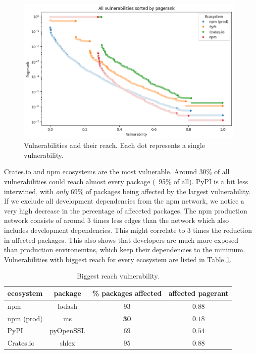 \documentclass[9pt,twocolumn,twoside]{pnas-report}
\begin{document}
\begin{figure}[t]\centering%
	\includegraphics[width=\linewidth]{vulns_pagerank.png}
	\caption{Vulnerabilities and their reach. Each dot represents a single vulnerability. }
	\label{fig:reach}
\end{figure}

Crates.io and npm ecosystems are the most vulnerable.
Around 30\% of all vulnerabilities could reach almost every package (~95\% of all).
PyPI is a bit less interwined, with \textit{only} 69\% of packages being affected by the largest vulnerability.
If we exclude all development dependencies from the npm network, we notice a very high decrease in the percentage of affeceted packages.
The npm production network consists of around 3 times less edges than the network which also includes development dependencies.
This might correlate to 3 times the reduction in affected packages.
This also shows that developers are much more exposed than production environemtns, which keep their dependencies to the minimum.
Vulnerabilities with biggest reach for every ecosystem are listed in Table \ref{tab:highest_reach}.

\begin{table}[h]\centering%
	\caption{Biggest reach vulnerability.}
	\begin{tabular}{l|ccc}
		ecosystem  & package   & \% packages affected & affected pagerant \\\hline
		npm        & lodash    & $93$                 & $0.88$            \\
		npm (prod) & ms        & $\mathbf{30}$        & $\mathbf{0.18}$   \\
		PyPI       & pyOpenSSL & $69$                 & $0.54$            \\
		Crates.io  & shlex     & $95$                 & $0.88$            \\
	\end{tabular}
	\label{tab:highest_reach}
\end{table}
\end{document}
